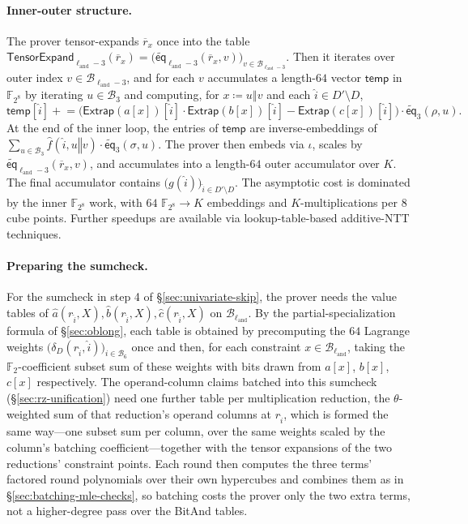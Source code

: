 \documentclass{article}
\theoremstyle{definition}
\newcommand*{\mle}{\widetilde}
\newcommand{\eq}{\mathsf{eq}}
\newcommand{\BB}{\mathcal{B}}
\newcommand{\FF}[1]{\mathbb{F}_{#1}}
\begin{document}
\paragraph{Inner-outer structure.}
The prover tensor-expands $\overline{r}_x$ once into the table $\textsf{TensorExpand}_{\ell_\text{and} - 3}(\overline{r}_x) = \bigl( \mle{\eq}_{\ell_\text{and} - 3}(\overline{r}_x, v) \bigr)_{v \in \BB_{\ell_\text{and} - 3}}$. Then it iterates over outer index $v \in \BB_{\ell_\text{and} - 3}$, and for each $v$ accumulates a length-$64$ vector $\textsf{temp}$ in $\FF{2^8}$ by iterating $u \in \BB_3$ and computing, for $x \coloneqq u \mathbin{\Vert} v$ and each $\widehat{i} \in D' \setminus D$,
\[
  \textsf{temp}[\widehat{i}] \mathrel{+}= \bigl( \textsf{Extrap}(a[x])[\widehat{i}] \cdot \textsf{Extrap}(b[x])[\widehat{i}] - \textsf{Extrap}(c[x])[\widehat{i}] \bigr) \cdot \mle{\eq}_3(\rho, u).
\]
At the end of the inner loop, the entries of $\textsf{temp}$ are inverse-embeddings of $\sum_{u \in \BB_3} \widehat{f}(\widehat{i}, u \mathbin{\Vert} v) \cdot \mle{\eq}_3(\sigma, u)$. The prover then embeds via $\iota$, scales by $\mle{\eq}_{\ell_\text{and} - 3}(\overline{r}_x, v)$, and accumulates into a length-$64$ outer accumulator over $K$. The final accumulator contains $\bigl( g(\widehat{i}) \bigr)_{\widehat{i} \in D' \setminus D}$. The asymptotic cost is dominated by the inner $\FF{2^8}$ work, with $64$ $\FF{2^8} \to K$ embeddings and $K$-multiplications per $8$ cube points. Further speedups are available via lookup-table-based additive-NTT techniques.

\paragraph{Preparing the sumcheck.}
For the sumcheck in step 4 of \S\ref{sec:univariate-skip}, the prover needs the value tables of $\widehat{a}(r_{\widehat{i}}, X), \widehat{b}(r_{\widehat{i}}, X), \widehat{c}(r_{\widehat{i}}, X)$ on $\BB_{\ell_\text{and}}$. By the partial-specialization formula of \S\ref{sec:oblong}, each table is obtained by precomputing the $64$ Lagrange weights $\bigl( \delta_D(r_{\widehat{i}}, \widehat{i}) \bigr)_{i \in \BB_6}$ once and then, for each constraint $x \in \BB_{\ell_\text{and}}$, taking the $\FF{2}$-coefficient subset sum of these weights with bits drawn from $a[x]$, $b[x]$, $c[x]$ respectively. The operand-column claims batched into this sumcheck (\S\ref{sec:rz-unification}) need one further table per multiplication reduction, the $\theta$-weighted sum of that reduction's operand columns at $r_{\widehat{i}}$, which is formed the same way---one subset sum per column, over the same weights scaled by the column's batching coefficient---together with the tensor expansions of the two reductions' constraint points. Each round then computes the three terms' factored round polynomials over their own hypercubes and combines them as in \S\ref{sec:batching-mle-checks}, so batching costs the prover only the two extra terms, not a higher-degree pass over the BitAnd tables.
\end{document}
